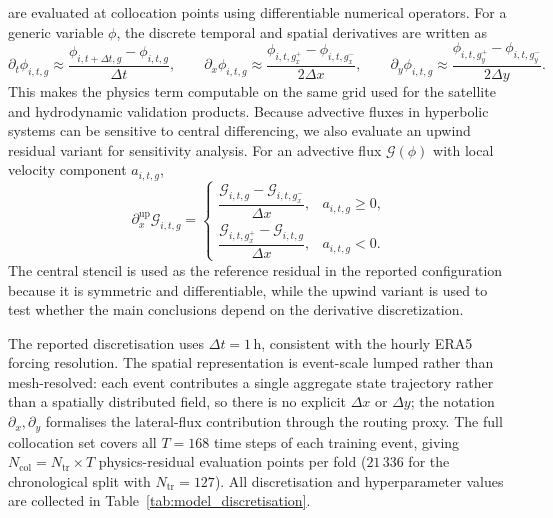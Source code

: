 \documentclass[pdflatex,sn-mathphys-ay]{sn-jnl}
\theoremstyle{thmstyleone}
\begin{document}
are evaluated at collocation points using differentiable numerical
operators.  For a generic variable $\phi$, the discrete temporal and
spatial derivatives are written as
\begin{equation}
  \partial_{t}\phi_{i,t,g}
  \approx
  \frac{
    \phi_{i,t+\Delta t,g}
    -
    \phi_{i,t,g}
  }{\Delta t},
  \qquad
  \partial_{x}\phi_{i,t,g}
  \approx
  \frac{
    \phi_{i,t,g^{+}_{x}}
    -
    \phi_{i,t,g^{-}_{x}}
  }{2\Delta x},
  \qquad
  \partial_{y}\phi_{i,t,g}
  \approx
  \frac{
    \phi_{i,t,g^{+}_{y}}
    -
    \phi_{i,t,g^{-}_{y}}
  }{2\Delta y}.
  \label{eq:padr_discrete_derivatives}
\end{equation}
This makes the physics term computable on the same grid used for the
satellite and hydrodynamic validation products.  Because advective
fluxes in hyperbolic systems can be sensitive to central differencing,
we also evaluate an upwind residual variant for sensitivity analysis.
For an advective flux $\mathcal{G}(\phi)$ with local velocity component
$a_{i,t,g}$,
\begin{equation}
  \partial_x^{\mathrm{up}}
  \mathcal{G}_{i,t,g}
  =
  \begin{cases}
    \dfrac{\mathcal{G}_{i,t,g}-\mathcal{G}_{i,t,g_x^-}}{\Delta x},
    & a_{i,t,g}\geq 0, \\
    \dfrac{\mathcal{G}_{i,t,g_x^+}-\mathcal{G}_{i,t,g}}{\Delta x},
    & a_{i,t,g}<0.
  \end{cases}
  \label{eq:padr_upwind_derivative}
\end{equation}
The central stencil is used as the reference residual in the reported
configuration because it is symmetric and differentiable, while the
upwind variant is used to test whether the main conclusions depend on
the derivative discretization.

The reported discretisation uses $\Delta t = 1\,\mathrm{h}$, consistent
with the hourly ERA5 forcing resolution.  The spatial representation is
event-scale lumped rather than mesh-resolved: each event contributes a
single aggregate state trajectory rather than a spatially distributed
field, so there is no explicit $\Delta x$ or $\Delta y$; the notation
$\partial_x,\partial_y$ formalises the lateral-flux contribution through
the routing proxy.  The full collocation set covers all $T=168$
time steps of each training event, giving $N_{\mathrm{col}}=N_{\mathrm{tr}}\times T$
physics-residual evaluation points per fold ($21\,336$ for the
chronological split with $N_{\mathrm{tr}}=127$).  All discretisation
and hyperparameter values are collected in
Table~\ref{tab:model_discretisation}.
\end{document}
